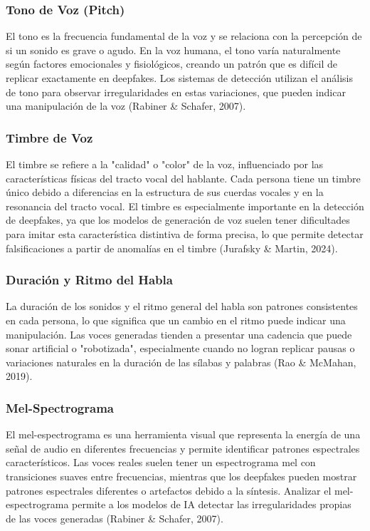 \subsubsection{Tono de Voz (Pitch)}
El tono es la frecuencia fundamental de la voz y se relaciona con la percepción de si un sonido es grave o agudo. En la voz humana, el tono varía naturalmente según factores emocionales y fisiológicos, creando un patrón que es difícil de replicar exactamente en deepfakes. Los sistemas de detección utilizan el análisis de tono para observar irregularidades en estas variaciones, que pueden indicar una manipulación de la voz (Rabiner \& Schafer, 2007).

\subsubsection{Timbre de Voz}
El timbre se refiere a la "calidad" o "color" de la voz, influenciado por las características físicas del tracto vocal del hablante. Cada persona tiene un timbre único debido a diferencias en la estructura de sus cuerdas vocales y en la resonancia del tracto vocal. El timbre es especialmente importante en la detección de deepfakes, ya que los modelos de generación de voz suelen tener dificultades para imitar esta característica distintiva de forma precisa, lo que permite detectar falsificaciones a partir de anomalías en el timbre (Jurafsky \& Martin, 2024).

\subsubsection{Duración y Ritmo del Habla}
La duración de los sonidos y el ritmo general del habla son patrones consistentes en cada persona, lo que significa que un cambio en el ritmo puede indicar una manipulación. Las voces generadas tienden a presentar una cadencia que puede sonar artificial o "robotizada", especialmente cuando no logran replicar pausas o variaciones naturales en la duración de las sílabas y palabras (Rao \& McMahan, 2019).

\subsubsection{Mel-Spectrograma}
El mel-espectrograma es una herramienta visual que representa la energía de una señal de audio en diferentes frecuencias y permite identificar patrones espectrales característicos. Las voces reales suelen tener un espectrograma mel con transiciones suaves entre frecuencias, mientras que los deepfakes pueden mostrar patrones espectrales diferentes o artefactos debido a la síntesis. Analizar el mel-espectrograma permite a los modelos de IA detectar las irregularidades propias de las voces generadas (Rabiner \& Schafer, 2007).

